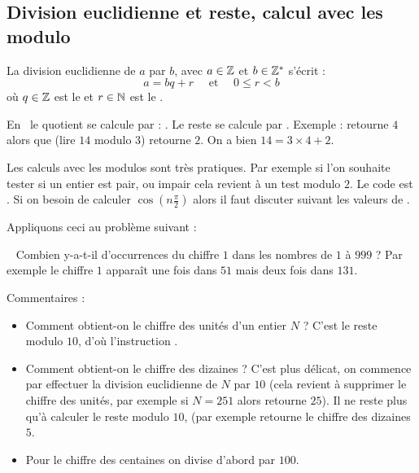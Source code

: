 \documentclass[class=report,crop=false]{standalone}
\begin{document}
\subsection{Division euclidienne et reste, calcul avec les modulo}

La division euclidienne de $a$ par $b$, avec $a \in \mathbb{Z}$ et $b \in \mathbb{Z}^*$ s'écrit :
$$a = bq+r \quad \text{ et } \quad 0 \le r < b$$
où $q \in \mathbb{Z}$ est le  et $r \in \mathbb{N}$ est le .



En \Python\ le quotient se calcule par : .
Le reste se calcule par .
Exemple :  retourne $4$ alors que  (lire $14$ modulo $3$)
retourne $2$. On a bien $14 = 3 \times 4 + 2$.

Les calculs avec les modulos sont très pratiques.
Par exemple si l'on souhaite tester si un entier est pair, ou impair cela revient à un test modulo $2$.
Le code est .
Si on besoin de calculer $\cos( n\frac\pi2)$ alors il faut discuter
suivant les valeurs de .

\bigskip

Appliquons ceci au problème suivant :
\begin{tp}~
Combien y-a-t-il d’occurrences du chiffre $1$ dans les nombres de $1$ à $999$ ?
Par exemple le chiffre $1$ apparaît une fois dans $51$ mais deux fois dans $131$.
\end{tp}



Commentaires :
\begin{itemize}
  \item Comment obtient-on le chiffre des unités d'un entier $N$ ? C'est le reste modulo $10$, d'où l'instruction
  .
  \item Comment obtient-on le chiffre des dizaines ? C'est plus délicat, on commence par effectuer la division euclidienne de
  $N$ par $10$ (cela revient à supprimer le chiffre des unités,
  par exemple si $N=251$ alors  retourne $25$). Il ne reste plus qu'à calculer le reste modulo $10$, (par exemple
   retourne le chiffre des dizaines $5$.
  \item Pour le chiffre des centaines on divise d'abord par $100$.
\end{itemize}


\end{document}
